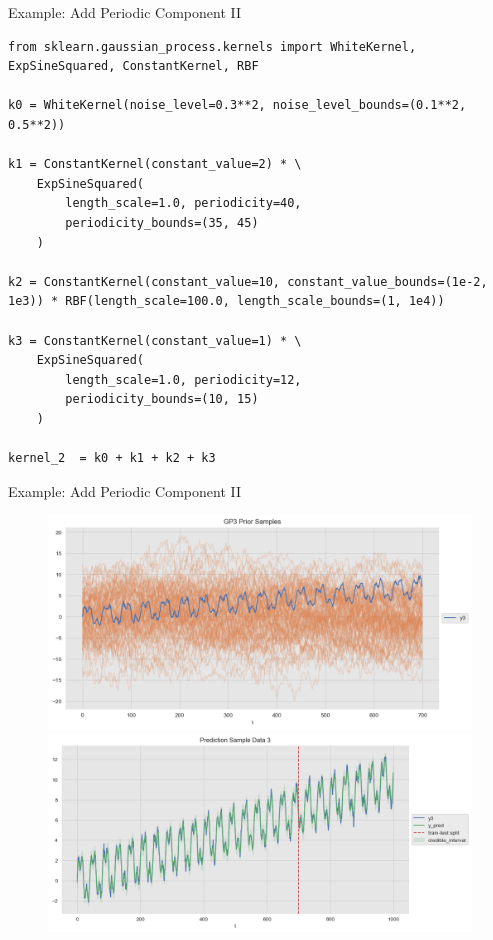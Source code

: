 \documentclass[10pt]{beamer}
\begin{document}
\begin{frame}[fragile]{Example: Add Periodic Component II }
\begin{lstlisting}
from sklearn.gaussian_process.kernels import WhiteKernel, ExpSineSquared, ConstantKernel, RBF

k0 = WhiteKernel(noise_level=0.3**2, noise_level_bounds=(0.1**2, 0.5**2))

k1 = ConstantKernel(constant_value=2) * \ 
    ExpSineSquared(
        length_scale=1.0, periodicity=40, 
        periodicity_bounds=(35, 45)
    )

k2 = ConstantKernel(constant_value=10, constant_value_bounds=(1e-2, 1e3)) * RBF(length_scale=100.0, length_scale_bounds=(1, 1e4)) 

k3 = ConstantKernel(constant_value=1) * \ 
    ExpSineSquared(
        length_scale=1.0, periodicity=12, 
        periodicity_bounds=(10, 15)
    )

kernel_2  = k0 + k1 + k2 + k3
\end{lstlisting}
\end{frame}

\begin{frame}{Example: Add Periodic Component II }
\begin{center}
\begin{figure}
\includegraphics[scale=0.30]{images/gaussian_process_time_series_files/gaussian_process_time_series_63_0.png}
\includegraphics[scale=0.30]{images/gaussian_process_time_series_files/gaussian_process_time_series_68_0.png}
\end{figure}
\end{center}
\end{frame}
\end{document}
